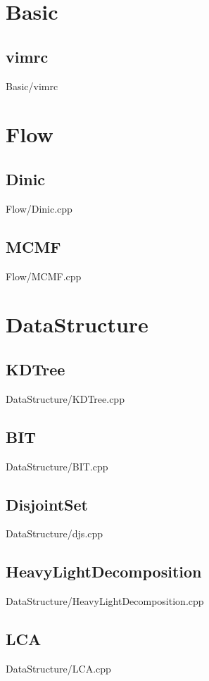 \section{Basic}
    \subsection{vimrc}
         {Basic/vimrc}

\section{Flow}
    \subsection{Dinic}
         {Flow/Dinic.cpp}
    \subsection{MCMF}
         {Flow/MCMF.cpp}

\section{DataStructure}
    \subsection{KDTree}
         {DataStructure/KDTree.cpp}
    \subsection{BIT}
         {DataStructure/BIT.cpp}
    \subsection{DisjointSet}
         {DataStructure/djs.cpp}
    \subsection{HeavyLightDecomposition}
         {DataStructure/HeavyLightDecomposition.cpp}
    \subsection{LCA}
         {DataStructure/LCA.cpp}
